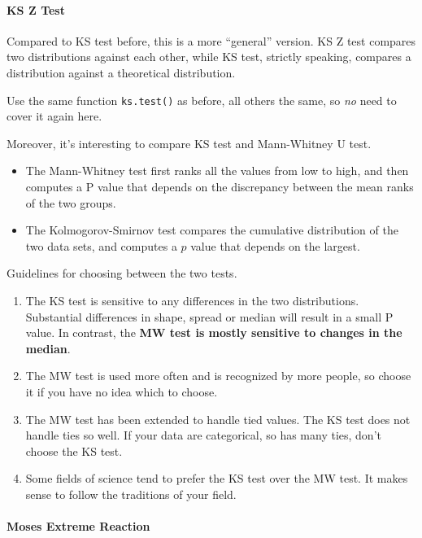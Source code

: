 \documentclass[
]{ctexart}
\providecommand{\tightlist}{%
  \setlength{\itemsep}{0pt}\setlength{\parskip}{0pt}}
\begin{document}
\hypertarget{ks-z-test}{%
\paragraph{KS Z Test}\label{ks-z-test}}

Compared to KS test before, this is a more ``general'' version. KS Z
test compares two distributions against each other, while KS test,
strictly speaking, compares a distribution against a theoretical
distribution.

Use the same function \texttt{ks.test()} as before, all others the same,
so \emph{no} need to cover it again here.

Moreover, it's interesting to compare KS test and Mann-Whitney U test.

\begin{itemize}
\tightlist
\item
  The Mann-Whitney test first ranks all the values from low to high, and
  then computes a P value that depends on the discrepancy between the
  mean ranks of the two groups.
\item
  The Kolmogorov-Smirnov test compares the cumulative distribution of
  the two data sets, and computes a \(p\) value that depends on the
  largest.
\end{itemize}

Guidelines for choosing between the two tests.

\begin{enumerate}
\def\labelenumi{\arabic{enumi}.}
\tightlist
\item
  The KS test is sensitive to any differences in the two distributions.
  Substantial differences in shape, spread or median will result in a
  small P value. In contrast, the \textbf{MW test is mostly sensitive to
  changes in the median}.
\item
  The MW test is used more often and is recognized by more people, so
  choose it if you have no idea which to choose.
\item
  The MW test has been extended to handle tied values. The KS test does
  not handle ties so well. If your data are categorical, so has many
  ties, don't choose the KS test.
\item
  Some fields of science tend to prefer the KS test over the MW test. It
  makes sense to follow the traditions of your field.
\end{enumerate}

\hypertarget{moses-extreme-reaction}{%
\paragraph{Moses Extreme Reaction}\label{moses-extreme-reaction}}
\end{document}
